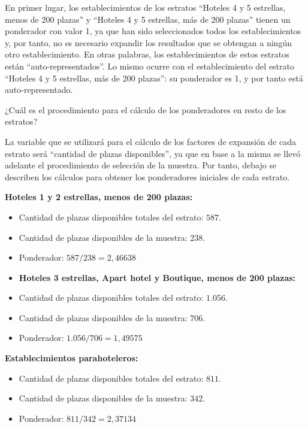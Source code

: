 \documentclass[
]{book}
\begin{document}
En primer lugar, los establecimientos de los estratos ``Hoteles 4 y 5 estrellas, menos de 200 plazas'' y ``Hoteles 4 y 5 estrellas, más de 200 plazas'' tienen un ponderador con valor 1, ya que han sido seleccionados todos los establecimientos y, por tanto, no es necesario expandir los resultados que se obtengan a ningún otro establecimiento. En otras palabras, los establecimientos de estos estratos están ``auto-representados''. Lo mismo ocurre con el establecimiento del estrato ``Hoteles 4 y 5 estrellas, más de 200 plazas'': su ponderador es 1, y por tanto está auto-representado.

¿Cuál es el procedimiento para el cálculo de los ponderadores en resto de los estratos?

La variable que se utilizará para el cálculo de los factores de expansión de cada estrato será ``cantidad de plazas disponibles'', ya que en base a la misma se llevó adelante el procedimiento de selección de la muestra. Por tanto, debajo se describen los cálculos para obtener los ponderadores iniciales de cada estrato.

\textbf{Hoteles 1 y 2 estrellas, menos de 200 plazas:}

\begin{itemize}
\item
  Cantidad de plazas disponibles totales del estrato: \(587\).
\item
  Cantidad de plazas disponibles de la muestra: \(238\).
\item
  Ponderador: \(587/238=2,46638\)
\item
  \textbf{Hoteles 3 estrellas, Apart hotel y Boutique, menos de 200 plazas:}
\item
  Cantidad de plazas disponibles totales del estrato: \(1.056\).
\item
  Cantidad de plazas disponibles de la muestra: \(706\).
\item
  Ponderador: \(1.056/706=1,49575\)
\end{itemize}

\textbf{Establecimientos parahoteleros:}

\begin{itemize}
\item
  Cantidad de plazas disponibles totales del estrato: \(811\).
\item
  Cantidad de plazas disponibles de la muestra: \(342\).
\item
  Ponderador: \(811/342=2,37134\)
\end{itemize}
\end{document}
